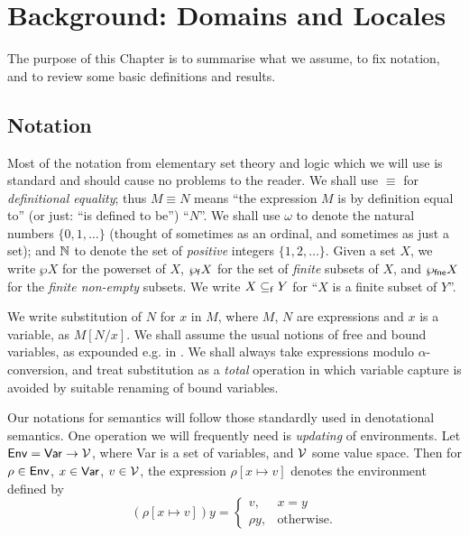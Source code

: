 \chapter{Background: Domains and Locales}
The purpose of this Chapter is to summarise what we assume, to fix notation, and to review some basic definitions and results.
\section{Notation}
Most of the notation from elementary set theory and logic which we will use is standard and should cause no problems to the reader.
We shall use $\equiv$ for {\it definitional equality}; thus $M \equiv N$ 
means ``the expression $M$ is by definition equal to'' (or just: ``is defined to be'') ``$N$''.
We shall use $\omega$ to denote the natural numbers $\{ 0, 1, \ldots \}$ (thought of sometimes as an ordinal, and sometimes as just a set); and $\Bbb N$ to denote the set of {\em positive} integers $\{ 1, 2, \ldots \}$.
Given a set $X$, we write $\wp X$ for the powerset of $X$, $\wp_{\sf f} X$ for the set of {\em finite} subsets of $X$, and $\wp_{\sf fne} X$ for the {\em finite non-empty} subsets.
We write $X \subseteq_{\sf f} Y$ for ``$X$ is a finite subset of $Y$''.

We write substitution of $N$ for $x$ in $M$, where $M$, $N$ are expressions and $x$ is a variable, as $M[N/x]$.
We shall assume the usual notions of free and bound variables, as expounded e.g. in \cite{Bar}.
We shall always take expressions modulo $\alpha$-conversion, and treat substitution as a {\em total} operation in which variable capture is avoided by suitable renaming of bound variables.

Our notations for semantics will follow those standardly used in denotational semantics.
One operation we will frequently need is {\it updating} of environments.
Let ${\sf Env} = {\sf Var} \rightarrow {\cal V}$, where {\sf Var} is a set of variables, and $\cal V$ some value space.
Then for $\rho \in {\sf Env}$, $x \in {\sf Var}$, $v \in {\cal V}$, the expression $\rho [x \mapsto v]$ denotes the environment defined by
\[ ( \rho [ x \mapsto v]) y = \left\{ \begin{array}{ll}
v, & x = y \\
\rho y, & \mbox{otherwise.}
\end{array} \right. \]

